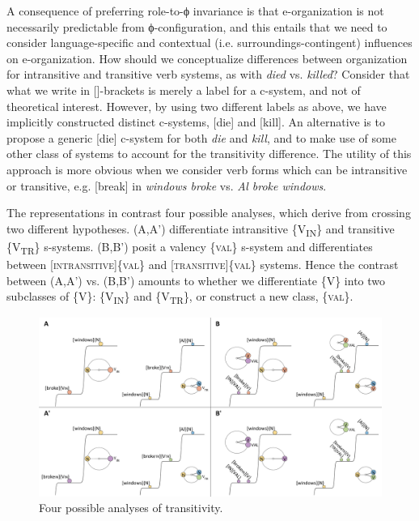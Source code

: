   A consequence of preferring role-to-ϕ invariance is that e-organization is not necessarily predictable from ϕ-configuration, and this entails that we need to consider language-specific and contextual (i.e. surroundings-contingent) influences on e-organization. How should we conceptualize differences between organization for intransitive and transitive verb systems, as with \textit{died} vs. \textit{killed}? Consider that what we write in []-brackets is merely a label for a c-system, and not of theoretical interest. However, by using two different labels as above, we have implicitly constructed distinct c-systems, [die] and [kill]. An alternative is to propose a generic [die] c-system for both \textit{die} and \textit{kill}, and to make use of some other class of systems to account for the transitivity difference. The utility of this approach is more obvious when we consider verb forms which can be intransitive or transitive, e.g. [break] in \textit{windows broke} vs. \textit{Al broke windows}. 

  The representations in {} contrast four possible analyses, which derive from crossing two different hypotheses. (A,A') differentiate intransitive \{V\textsubscript{IN}\} and transitive \{V\textsubscript{TR}\} s-systems. (B,B') posit a valency \{\textsc{val}\} s-system and differentiates between [\textsc{intransitive}]\{\textsc{val}\} and [\textsc{transitive}]\{\textsc{val}\} systems. Hence the contrast between (A,A') vs. (B,B') amounts to whether we differentiate \{V\} into two subclasses of \{V\}: \{V\textsubscript{IN}\} and \{V\textsubscript{TR}\}, or construct a new class, \{\textsc{val}\}.

  
\begin{figure}
\includegraphics[width=\textwidth]{figures/Tilsen-img72.png}
\caption{Four possible analyses of transitivity.}
\label{fig:4:22}
\end{figure}
 


